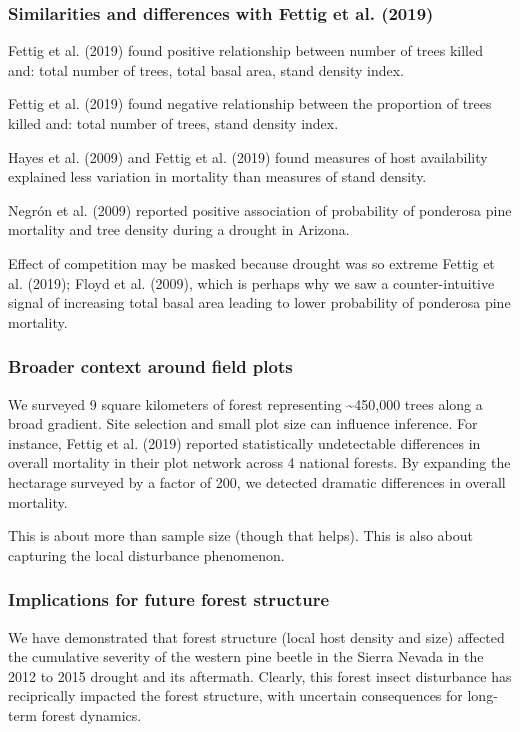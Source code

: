 \documentclass[]{article}
\begin{document}
\subsubsection{Similarities and differences with Fettig et al.
(2019)}\label{similarities-and-differences-with-fettig2019}

Fettig et al. (2019) found positive relationship between number of trees
killed and: total number of trees, total basal area, stand density
index.

Fettig et al. (2019) found negative relationship between the proportion
of trees killed and: total number of trees, stand density index.

Hayes et al. (2009) and Fettig et al. (2019) found measures of host
availability explained less variation in mortality than measures of
stand density.

Negrón et al. (2009) reported positive association of probability of
ponderosa pine mortality and tree density during a drought in Arizona.

Effect of competition may be masked because drought was so extreme
Fettig et al. (2019); Floyd et al. (2009), which is perhaps why we saw a
counter-intuitive signal of increasing total basal area leading to lower
probability of ponderosa pine mortality.

\subsubsection{Broader context around field
plots}\label{broader-context-around-field-plots}

We surveyed 9 square kilometers of forest representing
\textasciitilde{}450,000 trees along a broad gradient. Site selection
and small plot size can influence inference. For instance, Fettig et al.
(2019) reported statistically undetectable differences in overall
mortality in their plot network across 4 national forests. By expanding
the hectarage surveyed by a factor of 200, we detected dramatic
differences in overall mortality.

This is about more than sample size (though that helps). This is also
about capturing the local disturbance phenomenon.

\subsubsection{Implications for future forest
structure}\label{implications-for-future-forest-structure}

We have demonstrated that forest structure (local host density and size)
affected the cumulative severity of the western pine beetle in the
Sierra Nevada in the 2012 to 2015 drought and its aftermath. Clearly,
this forest insect disturbance has reciprically impacted the forest
structure, with uncertain consequences for long-term forest dynamics.
\end{document}

